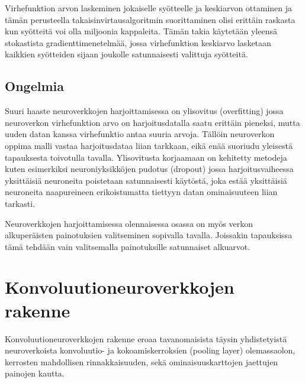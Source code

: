 \documentclass[finnish]{tktltiki2}
\theoremstyle{definition}
\theoremstyle{remark}
\begin{document}
  Virhefunktion arvon laskeminen jokaiselle syötteelle ja keskiarvon ottaminen ja tämän perusteella takaisinvirtausalgoritmin suorittaminen olisi erittäin raskasta kun syötteitä voi olla miljoonia kappaleita. Tämän takia käytetään yleensä stokastista gradienttimenetelmää, jossa virhefunktion keskiarvo lasketaan kaikkien syötteiden sijaan joukolle satunnaisesti valittuja syötteitä.





  \subsection{Ongelmia}

  Suuri haaste neuroverkkojen harjoittamisessa on ylisovitus (overfitting) jossa neuroverkon virhefunktion arvo on harjoitusdatalla saatu erittäin pieneksi, mutta uuden datan kanssa virhefunktio antaa suuria arvoja. Tällöin neuroverkon oppima malli vastaa harjoitusdataa liian tarkkaan, eikä enää suoriudu yleisestä tapauksesta toivotulla tavalla. Ylisovitusta korjaamaan on kehitetty metodeja kuten esimerkiksi neuroniyksikköjen pudotus (dropout) jossa harjoitusvaiheessa yksittäisiä neuroneita poistetaan satunnaisesti käytöstä, joka estää yksittäisiä neuroneita naapureineen erikoistumatta tiettyyn datan ominaisuuteen liian tarkasti.

  Neuroverkkojen harjoittamisessa olennaisessa osassa on myös verkon alkuperäisten painotuksien valitseminen sopivalla tavalla. Joissakin tapauksissa tämä tehdään vain valitsemalla painotuksille satunnaiset alkuarvot.



  \section{Konvoluutioneuroverkkojen rakenne}
    Konvoluutioneuroverkkojen rakenne eroaa tavanomaisista täysin yhdistetyistä neuroverkoista konvoluutio- ja kokoamiskerroksien (pooling layer) olemassaolon, kerrosten mahdollisen rinnakkaisuuden, sekä ominaisuuskarttojen jaettujen painojen kautta.   
    
\end{document}
